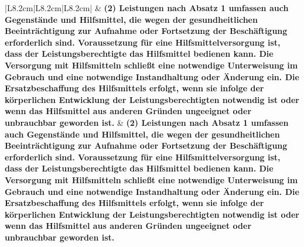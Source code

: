 \documentclass[10pt,a4paper,landscape]{article}
\begin{document}
\begin{longtable}{|L{8.2cm}|L{8.2cm}|L{8.2cm}|}
\hhline{|---|}
 & \textbf{(2) Leistungen nach Absatz 1 umfassen  \newline auch Gegenstände und Hilfsmittel, die  \newline wegen der gesundheitlichen  \newline Beeinträchtigung zur Aufnahme oder  \newline Fortsetzung der Beschäftigung  \newline erforderlich sind. Voraussetzung für  \newline eine Hilfsmittelversorgung ist, dass der  \newline Leistungsberechtigte das Hilfsmittel  \newline bedienen kann. Die Versorgung mit  \newline Hilfsmitteln schließt eine notwendige  \newline Unterweisung im Gebrauch und eine  \newline notwendige Instandhaltung oder  \newline Änderung ein. Die Ersatzbeschaffung  \newline des Hilfsmittels erfolgt, wenn sie infolge  \newline der körperlichen Entwicklung der  \newline Leistungsberechtigten notwendig ist  \newline oder wenn das Hilfsmittel aus anderen  \newline Gründen ungeeignet oder unbrauchbar  \newline geworden ist. } & \textbf{(2) Leistungen nach Absatz 1 umfassen  \newline auch Gegenstände und Hilfsmittel, die  \newline wegen der gesundheitlichen  \newline Beeinträchtigung zur Aufnahme oder  \newline Fortsetzung der Beschäftigung  \newline erforderlich sind. Voraussetzung für  \newline eine Hilfsmittelversorgung ist, dass der  \newline Leistungsberechtigte das Hilfsmittel  \newline bedienen kann. Die Versorgung mit  \newline Hilfsmitteln schließt eine notwendige  \newline Unterweisung im Gebrauch und eine  \newline notwendige Instandhaltung oder  \newline Änderung ein. Die Ersatzbeschaffung  \newline des Hilfsmittels erfolgt, wenn sie infolge  \newline der körperlichen Entwicklung der  \newline Leistungsberechtigten notwendig ist  \newline oder wenn das Hilfsmittel aus anderen  \newline Gründen ungeeignet oder unbrauchbar  \newline geworden ist. } \\

\end{longtable}
\end{document}
